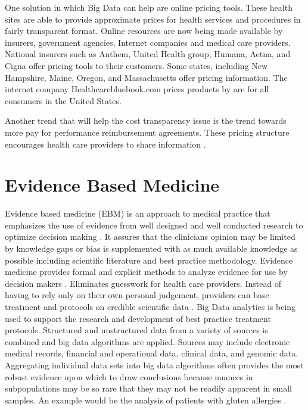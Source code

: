 \documentclass[sigconf]{acmart}
\begin{document}
{One solution in which Big Data can help are online pricing tools. These health sites are able to provide approximate prices for health services and procedures in fairly transparent format. Online resources are now being made available by insurers, government agencies, Internet companies and medical care providers. National insurers such as Anthem, United Health group, Humana, Aetna, and Cigna offer pricing tools to their customers. Some states, including New Hampshire, Maine, Oregon, and Massachusetts offer pricing information. The internet company Healthcarebluebook.com prices products by are for all consumers in the United States. 

Another trend that will help the cost transparency issue is the trend towards more pay for performance reimbursement agreements. These pricing structure encourages health care providers to share information \cite{www-google-christian}. 

\section{Evidence Based Medicine}
Evidence based medicine (EBM) is an approach to medical practice that emphasizes the use of evidence from well designed and well conducted research to optimize decision making \cite{www-google-wikievi}.  It assures that the clinicians opinion may be limited by knowledge gaps or bias is supplemented with as much available knowledge as possible including scientific literature and best practice methodology. Evidence medicine provides formal and explicit methods to analyze evidence for use by decision makers \cite{www-google-wikievi}.  Eliminates guesswork for health care providers. Instead of having to rely only on their own personal judgement, providers can base treatment and protocols on credible scientific data \cite{www-google-christian}.
Big Data analytics is being used to support the research and development of best practice treatment protocols.  Structured and unstructured data from a variety of sources is combined and big data algorithms are applied. Sources may include electronic medical records, financial and operational data, clinical data, and genomic data. Aggregating individual data sets into big data algorithms often provides the most robust evidence upon which to draw conclusions because nuances in subpopulations may be so rare that they may not be readily apparent in small samples. An example would be the analysis of patients with gluten allergies \cite{www-google-McKinsey}.
 
}
\end{document}

